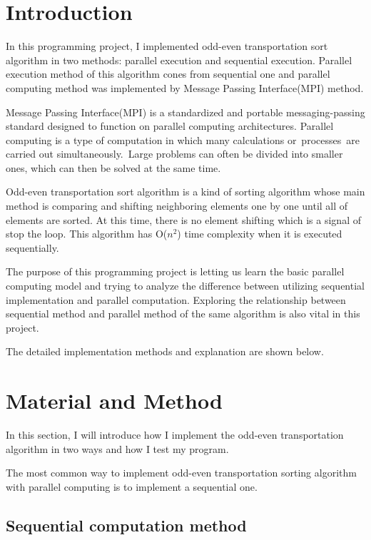 \newpage
\section{Introduction}

In this programming project, I implemented odd-even transportation sort algorithm in two methods: parallel execution and sequential execution. Parallel execution method of this algorithm cones from sequential one and parallel computing method was implemented by Message Passing Interface(MPI) method.

Message Passing Interface(MPI) is a standardized and portable messaging-passing standard designed to function on parallel computing architectures. Parallel computing is a type of computation in which many calculations or processes are carried out simultaneously. Large problems can often be divided into smaller ones, which can then be solved at the same time.

Odd-even transportation sort algorithm is a kind of sorting algorithm whose main method is comparing and shifting neighboring elements one by one until all of elements are sorted. At this time, there is no element shifting which is a signal of stop the loop. This algorithm has O($n^{2}$) time complexity when it is executed sequentially.

The purpose of this programming project is letting us learn the basic parallel computing model and trying to analyze the difference between utilizing sequential implementation and parallel computation. Exploring the relationship between sequential method and parallel method of the same algorithm is also vital in this project.

The detailed implementation methods and explanation are shown below.
\section{Material and Method}

In this section, I will introduce how I implement the odd-even transportation algorithm in two ways and how I test my program.

The most common way to implement odd-even transportation sorting algorithm with parallel computing is to implement a sequential one. 

\subsection{Sequential computation method}

